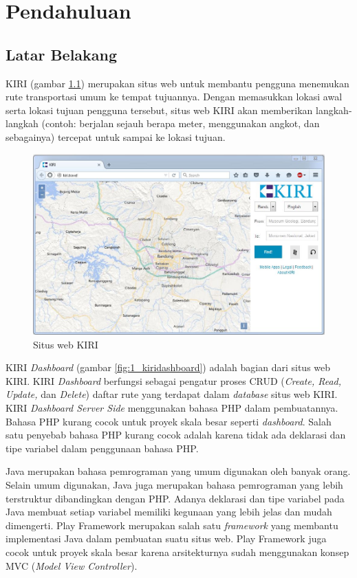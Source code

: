 \chapter{Pendahuluan}
\label{chap:pendahuluan}

\section{Latar Belakang}
\label{sec:latar_belakang}
KIRI\cite{kiritravel} (gambar \ref{fig:1_kiritravel}) merupakan situs web untuk membantu pengguna menemukan rute transportasi umum ke tempat tujuannya. Dengan memasukkan lokasi awal serta lokasi tujuan pengguna tersebut, situs web KIRI akan memberikan langkah-langkah (contoh: berjalan sejauh berapa meter, menggunakan angkot, dan sebagainya) tercepat untuk sampai ke lokasi tujuan.

\begin{figure}[htbp]
	\centering
		\includegraphics[scale=0.5]{Gambar/1_kiritravel.JPG}
	\caption{Situs web KIRI\cite{kiritravel}}
	\label{fig:1_kiritravel}
\end{figure}

KIRI \textit{Dashboard}\cite{devkiritravel} (gambar \ref{fig:1_kiridashboard}) adalah bagian dari situs web KIRI. KIRI \textit{Dashboard} berfungsi sebagai pengatur proses CRUD (\textit{Create, Read, Update,} dan \textit{Delete}) daftar rute yang terdapat dalam \textit{database} situs web KIRI. KIRI \textit{Dashboard Server Side} menggunakan bahasa PHP dalam pembuatannya\cite{kiridashboard}. Bahasa PHP kurang cocok untuk proyek skala besar seperti \textit{dashboard}. Salah satu penyebab bahasa PHP kurang cocok adalah karena tidak ada deklarasi dan tipe variabel dalam penggunaan bahasa PHP.

Java merupakan bahasa pemrograman yang umum digunakan oleh banyak orang. Selain umum digunakan, Java juga merupakan bahasa pemrograman yang lebih terstruktur dibandingkan dengan PHP. Adanya deklarasi dan tipe variabel pada Java membuat setiap variabel memiliki kegunaan yang lebih jelas dan mudah dimengerti. Play Framework merupakan salah satu \textit{framework} yang membantu implementasi Java dalam pembuatan suatu situs web. Play Framework juga cocok untuk proyek skala besar karena arsitekturnya sudah menggunakan konsep MVC (\textit{Model View Controller})\cite{playforjava}.

